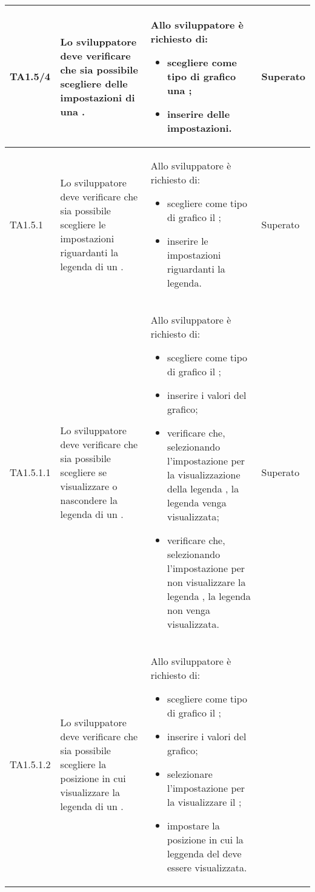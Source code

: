 \begin{longtabu}{| X[0.5] | X | X | X[0.5] |}
	TA1.5/4 & Lo sviluppatore deve verificare che sia possibile scegliere delle impostazioni di una .

		& Allo sviluppatore è richiesto di:
		\begin{itemize}
			\item scegliere come tipo di grafico una ;
			\item inserire delle impostazioni.
		\end{itemize}
& Superato \\ \hline

	TA1.5.1 & Lo sviluppatore deve verificare che sia possibile scegliere le impostazioni riguardanti la legenda di un .

		& Allo sviluppatore è richiesto di:
		\begin{itemize}
			\item scegliere come tipo di grafico il ;
			\item inserire le impostazioni riguardanti la legenda.
		\end{itemize}
& Superato \\ \hline

	TA1.5.1.1 & Lo sviluppatore deve verificare che sia possibile scegliere se visualizzare o nascondere la legenda di un .
			
		& Allo sviluppatore è richiesto di:
		\begin{itemize}
			\item scegliere come tipo di grafico il ;
			\item inserire i valori del grafico;
			\item verificare che, selezionando l'impostazione per la visualizzazione della legenda , la legenda venga visualizzata;
			\item verificare che, selezionando l'impostazione per non visualizzare la legenda , la legenda non venga visualizzata.
		\end{itemize}
& Superato \\ \hline

	TA1.5.1.2 & Lo sviluppatore deve verificare che sia possibile scegliere la posizione in cui visualizzare la legenda di un .
			
		& Allo sviluppatore è richiesto di:
		\begin{itemize}
			\item scegliere come tipo di grafico il ;
			\item inserire i valori del grafico;
			\item selezionare l'impostazione per la visualizzare il ;
			\item impostare la posizione in cui la leggenda del  deve essere visualizzata.


\end{itemize}
\end{longtabu}
